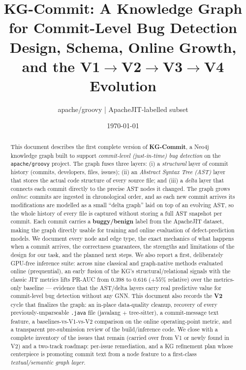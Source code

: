 \documentclass[11pt,a4paper]{article}
\title{\textbf{KG-Commit: A Knowledge Graph for Commit-Level Bug Detection}\\
	\large Design, Schema, Online Growth, and the V1$\rightarrow$V2$\rightarrow$V3$\rightarrow$V4 Evolution}
\author{apache/groovy \;|\; ApacheJIT-labelled subset}
\date{\today}
\begin{document}
	\maketitle
	
	\begin{abstract}
		This document describes the first complete version of \textbf{KG-Commit}, a
		Neo4j knowledge graph built to support \emph{commit-level (just-in-time) bug
			detection} on the \texttt{apache/groovy} project. The graph fuses three layers:
		(i) a \emph{structural} layer of commit history (commits, developers, files,
		issues); (ii) an \emph{Abstract Syntax Tree (AST)} layer that stores the actual
		code structure of every source file; and (iii) a \emph{delta} layer that
		connects each commit directly to the precise AST nodes it changed. The graph
		grows \emph{online}: commits are ingested in chronological order, and as each
		new commit arrives its modifications are modelled as a small ``delta graph''
		laid on top of an evolving AST, so the whole history of every file is captured
		without storing a full AST snapshot per commit. Each commit carries a
		\textbf{buggy/benign} label from the ApacheJIT dataset, making the graph
		directly usable for training and online evaluation of defect-prediction models.
		We document every node and edge type, the exact mechanics of what happens when a
		commit arrives, the correctness guarantees, the strengths and limitations of the
		design for our task, and the planned next steps. We also report a first,
		deliberately GPU-free inference suite: across nine classical and graph-native
		methods evaluated online (prequential), an early fusion of the KG's
		structural/relational signals with the classic JIT metrics lifts PR-AUC from
		$0.398$ to $0.616$ ($+55\%$ relative) over the metrics-only baseline ---
		evidence that the AST/delta layers carry real predictive value for commit-level
		bug detection without any GNN.
		This document also records the \textbf{V2} cycle that finalizes the graph:
		an in-place data-quality cleanup, recovery of every previously-unparseable
		\texttt{.java} file (javalang $+$ tree-sitter), a commit-message text feature,
		a baselines-vs-V1-vs-V2 comparison on the online operating-point metric, and a
		transparent pre-submission review of the build/inference code. We close with a
		complete inventory of the issues that remain (carried over from V1 or newly
		found in V2) and a two-track roadmap: per-issue remediation, and a KG
		refinement plan whose centerpiece is promoting commit text from a node feature
		to a first-class \emph{textual/semantic graph layer}.

\end{abstract}
\end{document}
